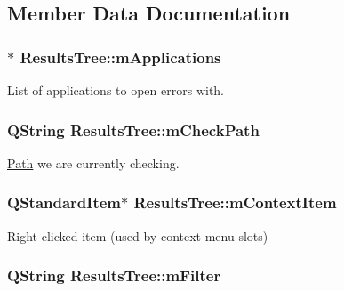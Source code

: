 \subsection{Member Data Documentation}
\hypertarget{class_results_tree_a984dd04477ae0aaec99c604aeb5cc7e6}{
\subsubsection[{m\-Applications}]{$\ast$ Results\-Tree\-::m\-Applications\hspace{0.3cm}{\ttfamily [protected]}}}\label{class_results_tree_a984dd04477ae0aaec99c604aeb5cc7e6}


List of applications to open errors with. 

\hypertarget{class_results_tree_a92586c85ef2b0c8ce3bc6fc8023cdfdc}{
\subsubsection[{m\-Check\-Path}]{\setlength{\rightskip}{0pt plus 5cm}Q\-String Results\-Tree\-::m\-Check\-Path\hspace{0.3cm}{\ttfamily [protected]}}}\label{class_results_tree_a92586c85ef2b0c8ce3bc6fc8023cdfdc}


\hyperlink{class_path}{Path} we are currently checking. 

\hypertarget{class_results_tree_add694da9be3cfcc2c7c185ed794d3048}{
\subsubsection[{m\-Context\-Item}]{\setlength{\rightskip}{0pt plus 5cm}Q\-Standard\-Item$\ast$ Results\-Tree\-::m\-Context\-Item\hspace{0.3cm}{\ttfamily [protected]}}}\label{class_results_tree_add694da9be3cfcc2c7c185ed794d3048}


Right clicked item (used by context menu slots) 

\hypertarget{class_results_tree_a1f4786e67be0097bc545284dab60362a}{
\subsubsection[{m\-Filter}]{\setlength{\rightskip}{0pt plus 5cm}Q\-String Results\-Tree\-::m\-Filter\hspace{0.3cm}{\ttfamily [protected]}}}\label{class_results_tree_a1f4786e67be0097bc545284dab60362a}


